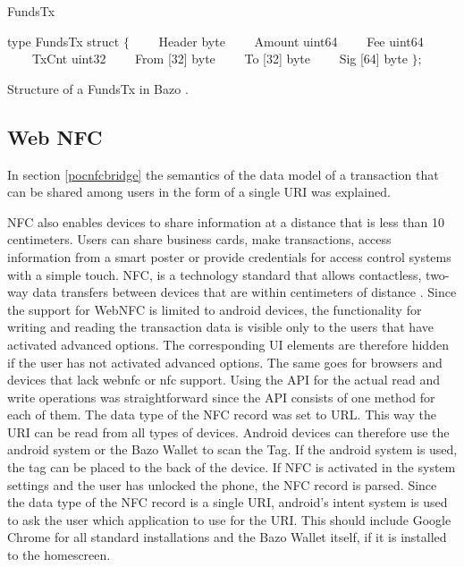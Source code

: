\begin{algorithm}
\caption{FundsTx}
\label{euclid}
\begin{algorithmic}[1]
\State type FundsTx struct $\{$
\State \ \ \ \ Header byte
\State \ \ \ \ Amount uint64
\State \ \ \ \ Fee uint64
\State \ \ \ \ TxCnt uint32
\State \ \ \ \ From [32] byte
\State \ \ \ \ To [32] byte
\State \ \ \ \ Sig [64] byte
\State  $\};$
\end{algorithmic}
\end{algorithm}\label{fig:FundsTX}Structure of a FundsTx in Bazo \cite{lisg}.


\subsection{Web NFC}
In section \ref{pocnfcbridge} the semantics of the data model of a transaction that can be shared among users in the form of a single URI was explained.

NFC also enables devices to share information at a distance that is less than 10 centimeters. Users can share business cards, make transactions, access information from a smart poster or provide credentials for access control systems with a simple touch.
NFC, is a technology standard that allows contactless, two-way data transfers between devices that are within centimeters of distance \cite{nfcforum}.
Since the support for WebNFC is limited to android devices, the functionality for writing and reading the transaction data is visible only to the users that have activated advanced options.
The corresponding UI elements are therefore hidden if the user has not activated advanced options. The same goes for browsers and devices that lack webnfc or nfc support.
Using the API for the actual read and write operations was straightforward since the API consists of one method for each of them. The data type of the NFC record was set to URL.
This way the URI can be read from all types of devices. Android devices can therefore use the android system or the Bazo Wallet to scan the Tag. If the android system is used, the tag can be placed to the back of the device. If NFC is activated in the system settings and the user has unlocked the phone, the NFC record is parsed. Since the data type of the NFC record is a single URI, android's intent system is used to ask the user which application to use for the URI. This should include Google Chrome for all standard installations and the Bazo Wallet itself, if it is installed to the homescreen.


